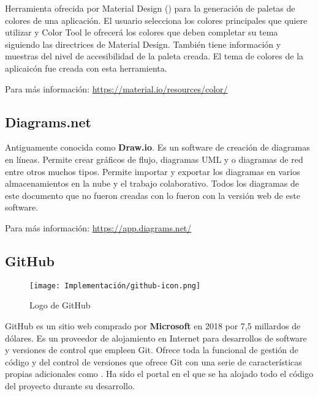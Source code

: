 Herramienta ofrecida por Material Design () para la generación de paletas de colores de una aplicación. El usuario selecciona los colores principales que quiere utilizar y Color Tool le ofrecerá los colores que deben completar su tema siguiendo las directrices de Material Design. También tiene información y muestras del nivel de accesibilidad de la paleta creada. El tema de colores de la aplicaicón fue creada con esta herramienta.

Para más información: \href{https://material.io/resources/color/}{https://material.io/resources/color/}

\subsection{Diagrams.net}

Antiguamente conocida como \textbf{Draw.io}. Es un software de creación de diagramas en líneas. Permite crear gráficos de flujo, diagramas UML y o diagramas de red entre otros muchos tipos. Permite importar y exportar los diagramas en varios almacenamientos en la nube y el trabajo colaborativo. Todos los diagramas de este documento que no fueron creadas con  lo fueron con la versión web de este software.

Para más información: \href{https://app.diagrams.net/}{https://app.diagrams.net/}

\subsection{GitHub}
\label{ssec:github}

\begin{wrapfigure}[6]{r}{0.2\textwidth}
    \vspace{-25pt}
    \centering
    \texttt{[image: Implementación/github-icon.png]}
    \vspace{-10pt}
    \caption{Logo de GitHub}
\end{wrapfigure}

GitHub es un sitio web comprado por \textbf{Microsoft} en 2018 por 7,5 millardos de dólares. Es un proveedor de alojamiento en Internet para desarrollos de software y versiones de control que empleen Git. Ofrece toda la funcional de gestión de código y del control de versiones que ofrece Git con una serie de características propias adicionales como . Ha sido el portal en el que se ha alojado todo el código del proyecto durante su desarrollo.

